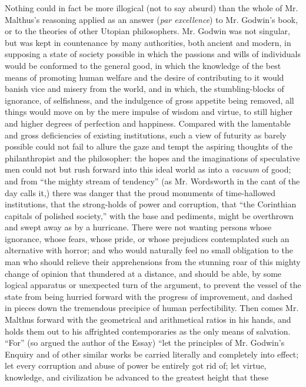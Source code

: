 Nothing could in fact be more illogical (not to say absurd) than
the whole of Mr. Malthus's reasoning applied as an answer
(\emph{par excellence}) to Mr. Godwin's book, or to the theories
of other Utopian philosophers.  Mr. Godwin was not singular, but
was kept in countenance by many authorities, both ancient and
modern, in supposing a state of society possible in which the
passions and wills of individuals would be conformed to the
general good, in which the knowledge of the best means of
promoting human welfare and the desire of contributing to it would
banish vice and misery from the world, and in which, the
stumbling-blocks of ignorance, of selfishness, and the indulgence
of gross appetite being removed, all things would move on by the
mere impulse of wisdom and virtue, to still higher and higher
degrees of perfection and happiness. Compared with the lamentable
and gross deficiencies of existing institutions, such a view of
futurity as barely possible could not fail to allure the gaze and
tempt the aspiring thoughts of the philanthropist and the
philosopher: the hopes and the imaginations of speculative men
could not but rush forward into this ideal world as into a
\emph{vacuum} of good; and from ``the mighty stream of tendency''
(as Mr. Wordsworth in the cant of the day calls it,) there was
danger that the proud monuments of time-hallowed institutions,
that the strong-holds of power and corruption, that ``the
Corinthian capitals of polished society,'' with the base and
pediments, might be overthrown and swept away as by a
hurricane. There were not wanting persons whose ignorance, whose
fears, whose pride, or whose prejudices contemplated such an
alternative with horror; and who would naturally feel no small
obligation to the man who should relieve their apprehensions from
the stunning roar of this mighty change of opinion that thundered
at a distance, and should be able, by some logical apparatus or
unexpected turn of the argument, to prevent the vessel of the
state from being hurried forward with the progress of improvement,
and dashed in pieces down the tremendous precipice of human
perfectibility. Then comes Mr.  Malthus forward with the
geometrical and arithmetical ratios in his hands, and holds them
out to his affrighted contemporaries as the only means of
salvation. ``For'' (so argued the author of the Essay) ``let the
principles of Mr. Godwin's Enquiry and of other similar works be
carried literally and completely into effect; let every corruption
and abuse of power be entirely got rid of; let virtue, knowledge,
and civilization be advanced to the greatest height that these
